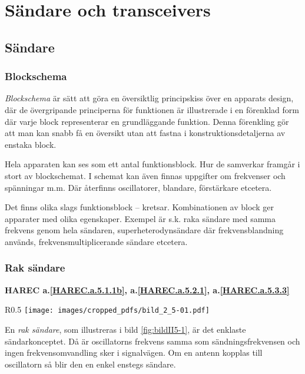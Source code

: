 \chapter[Sändare]{Sändare och transceivers}

\section{Sändare}
\label{sändare}

\subsection{Blockschema}

\emph{Blockschema} är sätt att göra en översiktlig principskiss över en
apparats design, där de övergripande principerna för funktionen är illustrerade
i en förenklad form där varje block representerar en grundläggande funktion.
Denna förenkling gör att man kan snabb få en översikt utan att fastna i
konstruktionsdetaljerna av enstaka block.

Hela apparaten kan ses som ett antal funktionsblock. Hur de samverkar
framgår i stort av blockschemat.
I schemat kan även finnas uppgifter om frekvenser och spänningar m.m.
Där återfinns oscillatorer, blandare, förstärkare etcetera.

Det finns olika slags funktionsblock -- kretsar. Kombinationen av block
ger apparater med olika egenskaper.
Exempel är s.k. raka sändare med samma frekvens genom hela sändaren,
superheterodynsändare där frekvensblandning används,
frekvensmultiplicerande sändare etcetera.

\subsection{Rak sändare}
\textbf{HAREC
  a.\ref{HAREC.a.5.1.1b}\label{myHAREC.a.5.1.1b},
  a.\ref{HAREC.a.5.2.1}\label{myHAREC.a.5.2.1},
  a.\ref{HAREC.a.5.3.3}\label{myHAREC.a.5.3.3}
}

\begin{wrapfigure}{R}{0.5\textwidth}
  \texttt{[image: images/cropped\_pdfs/bild\_2\_5-01.pdf]}
  \caption{Enstegs sändare}
  \label{fig:bildII5-1}
\end{wrapfigure}

En \emph{rak sändare}, som illustreras i bild \ref{fig:bildII5-1}, är det
enklaste sändarkonceptet.
Då är oscillatorns frekvens samma som sändningsfrekvensen och ingen
frekvensomvandling sker i signalvägen.
Om en antenn kopplas till oscillatorn så blir den en enkel enstegs sändare.

